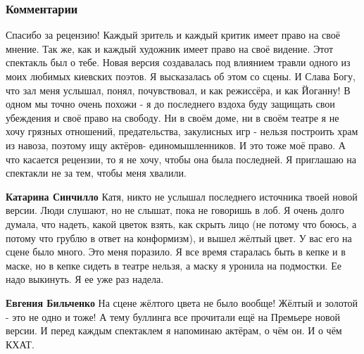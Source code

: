  
 
 
 
 
\subsubsection{Комментарии}
\label{sec:07_06_2021.fb.bilchenko_evgenia.1.recenzia_khat.cmt}

\begin{itemize}

Спасибо за рецензию! Каждый зритель и каждый критик имеет право на своё мнение.
Так же, как и каждый художник имеет право на своё видение. Этот спектакль был о
тебе. Новая версия создавалась под влиянием травли одного из моих любимых
киевских поэтов. Я высказалась об этом со сцены. И Слава Богу, что зал меня
услышал, понял, почувствовал, и как режиссёра, и как Йоганну! В одном мы точно
очень похожи - я до последнего вздоха буду защищать свои убеждения и своё право
на свободу. Ни в своём доме, ни в своём театре я не хочу грязных отношений,
предательства, закулисных игр - нельзя построить храм из навоза, поэтому ищу
актёров- единомышленников. И это тоже моё право. А что касается рецензии, то я
не хочу, чтобы она была последней. Я приглашаю на спектакли не за тем, чтобы
меня хвалили.

\begin{itemize}

\textbf{Катарина Синчилло} Катя, никто не услышал последнего источника твоей
новой версии. Люди слушают, но не слышат, пока не говоришь в лоб. Я очень долго
думала, что надеть, какой цветок взять, как скрыть лицо (не потому что боюсь, а
потому что грублю в ответ на конформизм), и вышел жёлтый цвет. У вас его на
сцене было много. Это меня поразило. Я все время старалась быть в кепке и в
маске, но в кепке сидеть в театре нельзя, а маску я уронила на подмостки. Ее
надо выкинуть. Я ее уже раз надела.

\textbf{Евгения Бильченко} На сцене жёлтого цвета не было вообще! Жёлтый и
золотой - это не одно и тоже! А тему буллинга все прочитали ещё на Премьере
новой версии. И перед каждым спектаклем я напоминаю актёрам, о чём он. И о чём
КХАТ.


\end{itemize}
\end{itemize}
